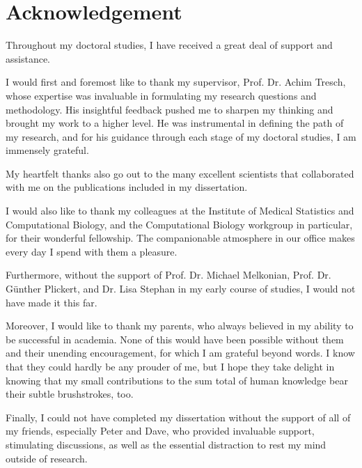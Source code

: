 \chapter*{Acknowledgement}

Throughout my doctoral studies, I have received a great deal of support and
assistance.

\bigbreak
\noindent I would first and foremost like to thank my supervisor, Prof. Dr.
Achim Tresch, whose expertise was invaluable in formulating my research
questions and methodology. His insightful feedback pushed me to sharpen my
thinking and brought my work to a higher level. He was instrumental in
defining the path of my research, and for his guidance through each stage of
my doctoral studies, I am immensely grateful.

\bigbreak
\noindent My heartfelt thanks also go out to the many excellent scientists
that collaborated with me on the publications included in my dissertation.

\bigbreak
\noindent I would also like to thank my colleagues at the Institute of Medical
Statistics and Computational Biology, and the Computational Biology workgroup
in particular, for their wonderful fellowship. The companionable atmosphere in
our office makes every day I spend with them a pleasure.

\bigbreak
\noindent Furthermore, without the support of Prof. Dr. Michael Melkonian,
Prof. Dr. Günther Plickert, and Dr. Lisa Stephan in my early course of
studies, I would not have made it this far.

\bigbreak
\noindent Moreover, I would like to thank my parents, who always believed in
my ability to be successful in academia. None of this would have been possible
without them and their unending encouragement, for which I am grateful beyond
words. I know that they could hardly be any prouder of me, but I hope they
take delight in knowing that my small contributions to the sum total of human
knowledge bear their subtle brushstrokes, too.

\bigbreak
\noindent Finally, I could not have completed my dissertation without the
support of all of my friends, especially Peter and Dave, who provided
invaluable support, stimulating discussions, as well as the essential
distraction to rest my mind outside of research.